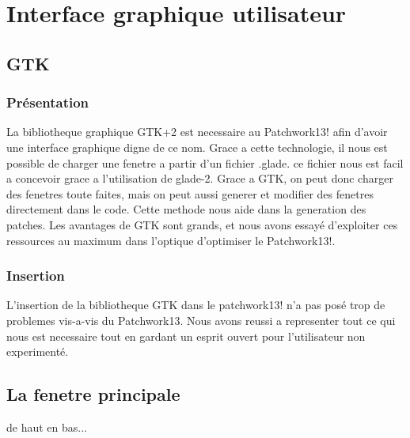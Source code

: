 \chapter{Interface graphique utilisateur}


\section{GTK}
\subsection{Pr\'esentation}
La bibliotheque graphique GTK+2 est necessaire au Patchwork13! afin d'avoir une 
interface graphique digne de ce nom. Grace a cette technologie, il nous est possible
de charger une fenetre a partir d'un fichier .glade. ce fichier nous est facil a 
concevoir grace a l'utilisation de glade-2. Grace a GTK, on peut donc charger des 
fenetres toute faites, mais on peut aussi generer et modifier des fenetres 
directement dans le code. Cette methode nous aide dans la generation des patches.
Les avantages de GTK sont grands, et nous avons essay\'e d'exploiter ces ressources 
au maximum dans l'optique d'optimiser le Patchwork13!.

\subsection{Insertion}
L'insertion de la bibliotheque GTK dans le patchwork13! n'a pas pos\'e trop de 
problemes vis-a-vis du Patchwork13. Nous avons reussi a representer tout ce qui 
nous est necessaire tout en gardant un esprit ouvert pour l'utilisateur non 
experiment\'e.

\section{La fenetre principale}
de haut en bas...
